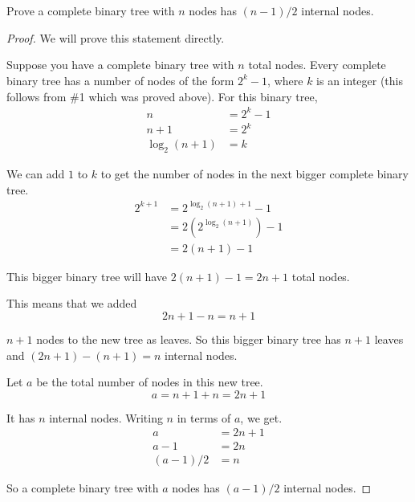 \documentclass[12pt]{article}
\begin{document}
\section{}

Prove a complete binary tree with $n$ nodes has $(n - 1)/2$ internal nodes.

\begin{proof}
We will prove this statement directly.
\bigskip

Suppose you have a complete binary tree with $n$ total nodes.  Every complete binary tree has a number of nodes of the form $2^{k}-1$, where $k$ is an integer (this follows from \#1 which was proved above).  For this binary tree, 
\begin{align}
    n &= 2^{k}-1 \\
    n+1 &= 2^k \\
    \log_{2}{(n+1)} &= k
\end{align}

We can add $1$ to $k$ to get the number of nodes in the next bigger complete binary tree.
\begin{align}
    2^{k+1} &= 2^{\log_{2}{(n+1)} + 1}-1 \\
    &= 2(2^{\log_{2}{(n+1)}}) - 1 \\
    &= 2(n+1) - 1
\end{align}

This bigger binary tree will have $2(n+1) - 1 = 2n + 1$ total nodes.

This means that we added
\begin{equation}
    2n+1 - n = n+1
\end{equation}

$n+1$ nodes to the new tree as leaves.  So this bigger binary tree has $n+1$ leaves and $(2n+1) - (n+1) = n$ internal nodes.

Let $a$ be the total number of nodes in this new tree.
\begin{equation}
    a = n+1 + n = 2n+1
\end{equation}

It has $n$ internal nodes.  Writing $n$ in terms of $a$, we get.
\begin{align}
    a &= 2n+1 \\
    a-1 &= 2n \\
    (a-1)/2 &= n
\end{align}

So a complete binary tree with $a$  nodes has $(a-1)/2$ internal nodes.

\end{proof}
\setcounter{equation}{0}
\end{document}
